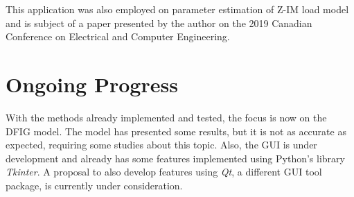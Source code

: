 This application was also employed on parameter estimation of Z-IM load model and is subject of a paper presented by the author on the 2019 Canadian Conference on Electrical and Computer Engineering.

\section{Ongoing Progress}

With the methods already implemented and tested, the focus is now on the DFIG model. The model has presented some results, but it is not as accurate as expected, requiring some studies about this topic. Also, the GUI is under development and already has some features implemented using Python's library \textit{Tkinter}. A proposal to also develop features using \textit{Qt}, a different GUI tool package, is currently under consideration.